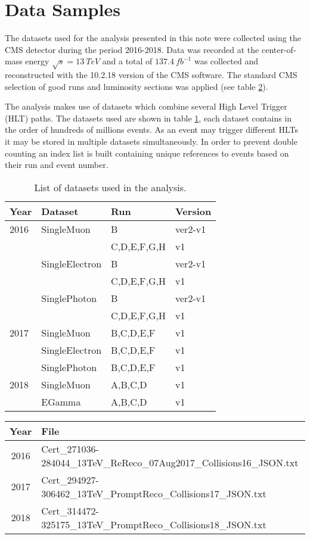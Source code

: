 \section{Data Samples}

The datasets used for the analysis presented in this note were collected using
the CMS detector during the period 2016-2018. Data was recorded at the
center-of-mass energy $\sqrt{s}=13~TeV$ and a total of $137.4~fb^{-1}$ was collected
and reconstructed with the 10.2.18 version of the CMS software. The standard
CMS selection of good runs and luminosity sections was applied
(see table \ref{tab:GoldenJson}).

The analysis makes use of datasets which combine several High Level Trigger
(HLT) paths. The datasets used are shown in table \ref{tab:Datasets}, each
dataset contains in the order of hundreds of millions events. As an event
may trigger different HLTs it may be stored in multiple datasets simultaneously.
In order to prevent double counting an index list is built containing unique
references to events based on their run and event number.

\begin{table}[h]
\centering
\caption{List of datasets used in the analysis.}
\begin{tabular}{|l|l|l|l|}
\hline
Year & Dataset & Run & Version \\ \hline
2016 & SingleMuon     & B           & ver2-v1 \\
     &                & C,D,E,F,G,H & v1      \\
     & SingleElectron & B           & ver2-v1 \\
     &                & C,D,E,F,G,H & v1      \\
     & SinglePhoton   & B           & ver2-v1 \\
     &                & C,D,E,F,G,H & v1      \\ \hline
2017 & SingleMuon     & B,C,D,E,F & v1 \\
     & SingleElectron & B,C,D,E,F & v1 \\
     & SinglePhoton   & B,C,D,E,F & v1 \\\hline
2018 & SingleMuon & A,B,C,D & v1 \\
     & EGamma     & A,B,C,D & v1 \\ \hline
\end{tabular}
\label{tab:Datasets}
\end{table}


\begin{table}[htbp]
  \footnotesize
  \centering
  \label{tab:gJSON}
  \begin{tabular}{ c l }
    \hline
    Year & File \\
    \hline
    2016 & Cert\_271036-284044\_13TeV\_ReReco\_07Aug2017\_Collisions16\_JSON.txt \\
    2017 & Cert\_294927-306462\_13TeV\_PromptReco\_Collisions17\_JSON.txt \\
    2018 & Cert\_314472-325175\_13TeV\_PromptReco\_Collisions18\_JSON.txt \\
    \hline
  \end{tabular}
  \label{tab:GoldenJson}
\end{table}


